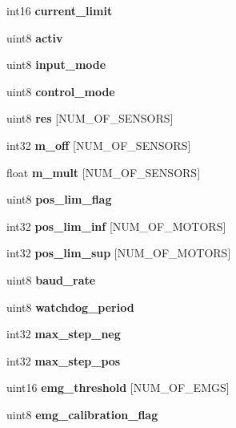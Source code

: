 \begin{DoxyCompactItemize}
int16 {\bfseries current\+\_\+limit}
\item 
\mbox{\label{structst__mem_a63bbebc1db55f43e0571006597a3488b}} 
uint8 {\bfseries activ}
\item 
\mbox{\label{structst__mem_ae5cc8b2ae06016f1fcf5b2f964618a12}} 
uint8 {\bfseries input\+\_\+mode}
\item 
\mbox{\label{structst__mem_af0c55b7d870673f2f6e9521c215d4b51}} 
uint8 {\bfseries control\+\_\+mode}
\item 
\mbox{\label{structst__mem_ac2e19d167eac4c8ca9ce97c646e78595}} 
uint8 {\bfseries res} [N\+U\+M\+\_\+\+O\+F\+\_\+\+S\+E\+N\+S\+O\+RS]
\item 
\mbox{\label{structst__mem_ab544f035124be893918bafb611fe88d9}} 
int32 {\bfseries m\+\_\+off} [N\+U\+M\+\_\+\+O\+F\+\_\+\+S\+E\+N\+S\+O\+RS]
\item 
\mbox{\label{structst__mem_aecf0baab567443534c0ded663b746896}} 
float {\bfseries m\+\_\+mult} [N\+U\+M\+\_\+\+O\+F\+\_\+\+S\+E\+N\+S\+O\+RS]
\item 
\mbox{\label{structst__mem_aa2ceebf7546e978c8b0393ce8035532d}} 
uint8 {\bfseries pos\+\_\+lim\+\_\+flag}
\item 
\mbox{\label{structst__mem_a631265c712a620e03d9233634e1819a2}} 
int32 {\bfseries pos\+\_\+lim\+\_\+inf} [N\+U\+M\+\_\+\+O\+F\+\_\+\+M\+O\+T\+O\+RS]
\item 
\mbox{\label{structst__mem_a818808d7c324999701b5aad40a8fabca}} 
int32 {\bfseries pos\+\_\+lim\+\_\+sup} [N\+U\+M\+\_\+\+O\+F\+\_\+\+M\+O\+T\+O\+RS]
\item 
\mbox{\label{structst__mem_a1a2b3002580421effeca67955a862580}} 
uint8 {\bfseries baud\+\_\+rate}
\item 
\mbox{\label{structst__mem_a1aae70aad54a04c7b41a8d2dcd7aba14}} 
uint8 {\bfseries watchdog\+\_\+period}
\item 
\mbox{\label{structst__mem_a14fe3ed96d232dced2d33efc493a0667}} 
int32 {\bfseries max\+\_\+step\+\_\+neg}
\item 
\mbox{\label{structst__mem_a9be5987152b8c6bb28c1d311bc94e5e3}} 
int32 {\bfseries max\+\_\+step\+\_\+pos}
\item 
\mbox{\label{structst__mem_aaeb84b2fd1a137ee9234fd3c24c97aaa}} 
uint16 {\bfseries emg\+\_\+threshold} [N\+U\+M\+\_\+\+O\+F\+\_\+\+E\+M\+GS]
\item 
\mbox{\label{structst__mem_a78f0b0c6db2a7118cd15ec0aa38ccdb9}} 
uint8 {\bfseries emg\+\_\+calibration\+\_\+flag}
\item 
\mbox{\label{structst__mem_aeb71cf2bff2584abb616d4b5dcc4c4af}} 

\end{DoxyCompactItemize}

